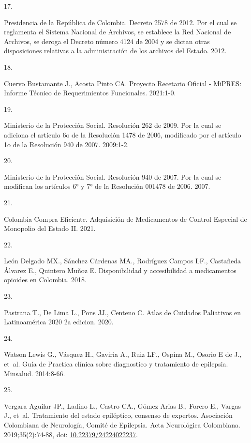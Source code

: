 \documentclass[
  oneside]{book}
\newlength{\cslhangindent}
\newlength{\csllabelwidth}
\newlength{\cslentryspacingunit} %
\newenvironment{CSLReferences}[2] %
 {%
  \setlength{\parindent}{0pt}
  \ifodd #1
  \let\oldpar\par
  \def\par{\hangindent=\cslhangindent\oldpar}
  \fi
  \setlength{\parskip}{#2\cslentryspacingunit}
 }%
 {}
\newcommand{\CSLLeftMargin}[1]{\parbox[t]{\csllabelwidth}{#1}}
\newcommand{\CSLRightInline}[1]{\parbox[t]{\linewidth - \csllabelwidth}{#1}\break}
\begin{document}
\begin{CSLReferences}{0}{0}
\leavevmode{}%
\CSLLeftMargin{17. }
\CSLRightInline{Presidencia de la República de Colombia. {Decreto 2578 de 2012. Por el cual se reglamenta el Sistema Nacional de Archivos, se establece la Red Nacional de Archivos, se deroga el Decreto n{ú}mero 4124 de 2004 y se dictan otras disposiciones relativas a la administraci{ó}n de los archivos del Estado.} 2012.}

\leavevmode{}%
\CSLLeftMargin{18. }
\CSLRightInline{Cuervo Bustamante J., Acosta Pinto CA. {Proyecto Recetario Oficial - MiPRES: Informe T{é}cnico de Requerimientos Funcionales}. 2021:1-0.}

\leavevmode{}%
\CSLLeftMargin{19. }
\CSLRightInline{Ministerio de la Protección Social. {Resoluci{ó}n 262 de 2009. Por la cual se adiciona el art{í}culo 6o de la Resoluci{ó}n 1478 de 2006, modificado por el art{í}culo 1o de la Resoluci{ó}n 940 de 2007.} 2009:1-2.}

\leavevmode{}%
\CSLLeftMargin{20. }
\CSLRightInline{Ministerio de la Protección Social. {Resoluci{ó}n 940 de 2007. Por la cual se modifican los art{í}culos 6° y 7° de la Resoluci{ó}n 001478 de 2006}. 2007.}

\leavevmode{}%
\CSLLeftMargin{21. }
\CSLRightInline{Colombia Compra Eficiente. {Adquisici{ó}n de Medicamentos de Control Especial de Monopolio del Estado II}. 2021.}

\leavevmode{}%
\CSLLeftMargin{22. }
\CSLRightInline{León Delgado MX., Sánchez Cárdenas MA., Rodríguez Campos LF., Castañeda Álvarez E., Quintero Muñoz E. {Disponibilidad y accesibilidad a medicamentos opioides en Colombia}. 2018.}

\leavevmode{}%
\CSLLeftMargin{23. }
\CSLRightInline{Pastrana T., De Lima L., Pons JJ., Centeno C. {Atlas de Cuidados Paliativos en Latinoam{é}rica 2020 2a edicion}. 2020.}

\leavevmode{}%
\CSLLeftMargin{24. }
\CSLRightInline{Watson Lewis G., Vásquez H., Gaviria A., Ruiz LF., Ospina M., Osorio E de J., et~al. {Gu{í}a de Practica cl{í}nica sobre diagnostico y tratamiento de epilepsia}. Minsalud. 2014:8-66.}

\leavevmode{}%
\CSLLeftMargin{25. }
\CSLRightInline{Vergara Aguilar JP., Ladino L., Castro CA., Gómez Arias B., Forero E., Vargas J., et~al. {Tratamiento del estado epil{é}ptico, consenso de expertos. Asociaci{ó}n Colombiana de Neurolog{í}a, Comit{é} de Epilepsia}. Acta Neurol{ó}gica Colombiana. 2019;35(2):74-88, doi: \href{https://doi.org/10.22379/24224022237}{10.22379/24224022237}.}


\end{CSLReferences}
\end{document}
